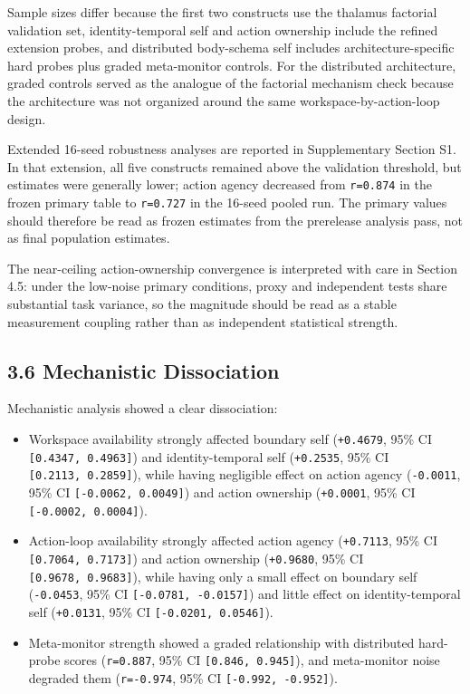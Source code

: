 \documentclass[
  11pt,
  letterpaper,
]{article}
\providecommand{\tightlist}{%
  \setlength{\itemsep}{0pt}\setlength{\parskip}{0pt}}
\begin{document}
Sample sizes differ because the first two constructs use the thalamus
factorial validation set, identity-temporal self and action ownership
include the refined extension probes, and distributed body-schema self
includes architecture-specific hard probes plus graded meta-monitor
controls. For the distributed architecture, graded controls served as
the analogue of the factorial mechanism check because the architecture
was not organized around the same workspace-by-action-loop design.

Extended 16-seed robustness analyses are reported in Supplementary
Section S1. In that extension, all five constructs remained above the
validation threshold, but estimates were generally lower; action agency
decreased from \texttt{r=0.874} in the frozen primary table to
\texttt{r=0.727} in the 16-seed pooled run. The primary values should
therefore be read as frozen estimates from the prerelease analysis pass,
not as final population estimates.

The near-ceiling action-ownership convergence is interpreted with care
in Section 4.5: under the low-noise primary conditions, proxy and
independent tests share substantial task variance, so the magnitude
should be read as a stable measurement coupling rather than as
independent statistical strength.

\subsection{3.6 Mechanistic
Dissociation}\label{mechanistic-dissociation}

Mechanistic analysis showed a clear dissociation:

\begin{itemize}
\tightlist
\item
  Workspace availability strongly affected boundary self
  (\texttt{+0.4679}, 95\% CI \texttt{{[}0.4347,\ 0.4963{]}}) and
  identity-temporal self (\texttt{+0.2535}, 95\% CI
  \texttt{{[}0.2113,\ 0.2859{]}}), while having negligible effect on
  action agency (\texttt{-0.0011}, 95\% CI
  \texttt{{[}-0.0062,\ 0.0049{]}}) and action ownership
  (\texttt{+0.0001}, 95\% CI \texttt{{[}-0.0002,\ 0.0004{]}}).
\item
  Action-loop availability strongly affected action agency
  (\texttt{+0.7113}, 95\% CI \texttt{{[}0.7064,\ 0.7173{]}}) and action
  ownership (\texttt{+0.9680}, 95\% CI \texttt{{[}0.9678,\ 0.9683{]}}),
  while having only a small effect on boundary self (\texttt{-0.0453},
  95\% CI \texttt{{[}-0.0781,\ -0.0157{]}}) and little effect on
  identity-temporal self (\texttt{+0.0131}, 95\% CI
  \texttt{{[}-0.0201,\ 0.0546{]}}).
\item
  Meta-monitor strength showed a graded relationship with distributed
  hard-probe scores (\texttt{r=0.887}, 95\% CI
  \texttt{{[}0.846,\ 0.945{]}}), and meta-monitor noise degraded them
  (\texttt{r=-0.974}, 95\% CI \texttt{{[}-0.992,\ -0.952{]}}).
\end{itemize}
\end{document}
